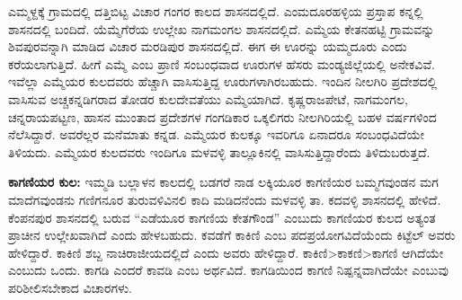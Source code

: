 ಎಮ್ಮಳ್ದಕ್ಕೆ ಗ್ರಾಮದಲ್ಲಿ ದತ್ತಿಬಿಟ್ಟ ವಿಚಾರ ಗಂಗರ ಕಾಲದ ಶಾಸನದಲ್ಲಿದೆ. ಎಂಮದೂರಹಳ್ಳಿಯ ಪ್ರಸ್ತಾಪ ಕನ್ನಲ್ಲಿ ಶಾಸನದಲ್ಲಿ ಬಂದಿದೆ. ಯೆಮ್ಮೆಗೆರೆಯ ಉಲ್ಲೇಖ ನಾಗಮಂಗಲ ಶಾಸನದಲ್ಲಿದೆ. ಎಮ್ಮೆಯ ಕೇತನಹಟ್ಟಿ ಗ್ರಾಮವನ್ನು ಶಿವಪುರವನ್ನಾಗಿ ಮಾಡಿದ ವಿಚಾರ ಮರಡಿಪುರ ಶಾಸನದಲ್ಲಿದೆ. ಈಗ ಈ ಊರನ್ನು ಯಮ್ಮದೂರು ಎಂದು ಕರೆಯಲಾಗುತ್ತಿದೆ. ಹೀಗೆ ಎಮ್ಮೆ ಎಂಬ ಪ್ರಾಣಿ ಸಂಬಂಧವಾದ ಊರುಗಳ ಹೆಸರು ಮಂಡ್ಯಜಿಲ್ಲೆಯಲ್ಲಿ ಅನೇಕವಿವೆ. ಇವೆಲ್ಲಾ ಎಮ್ಮೆಯರ ಕುಲದವರು ಹೆಚ್ಚಾಗಿ ವಾಸಿಸುತ್ತಿದ್ದ ಊರುಗಳಾಗಿರಬಹುದು. ಇಂದಿನ ನೀಲಗಿರಿ ಪ್ರದೇಶದಲ್ಲಿ ವಾಸಿಸುವ ಅಚ್ಚಕನ್ನಡಿಗರಾದ ತೋಡರ ಕುಲದೇವತೆಯು ಎಮ್ಮೆಯಾಗಿದೆ. ಕೃಷ್ಣರಾಜಪೇಟೆ, ನಾಗಮಂಗಲ, ಚನ್ನರಾಯಪಟ್ಟಣ, ಹಾಸನ ಮುಂತಾದ ಪ್ರದೇಶಗಳ ಗಂಗಡಿಕಾರ ಒಕ್ಕಲಿಗರು ನೀಲಗಿರಿಯಲ್ಲಿ ಬಹಳ ವರ್ಷಗಳಿಂದ ನೆಲೆಸಿದ್ದಾರೆ. ಅವರೆಲ್ಲರ ಮನೆಮಾತು ಕನ್ನಡ. ಎಮ್ಮೆಯರ ಕುಲಕ್ಕೂ ಇವರಿಗೂ ಏನಾದರೂ ಸಂಬಂಧವಿದೆಯೇ ತಿಳಿಯದು. ಎಮ್ಮೆಯರ ಕುಲದವರು ಇಂದಿಗೂ ಮಳವಳ್ಳಿ ತಾಲ್ಲೂಕಿನಲ್ಲಿ ವಾಸಿಸುತ್ತಿದ್ದಾರೆಂದು ತಿಳಿದುಬರುತ್ತದೆ.

\textbf{ಕಾಗಣಿಯರ ಕುಲ:} ಇಮ್ಮಡಿ ಬಲ್ಲಾಳನ ಕಾಲದಲ್ಲಿ ಬಡಗರೆ ನಾಡ ಲಕ್ಕಿಯೂರ ಕಾಗಣಿಯರ ಬಮ್ಮಗವುಂಡನ ಮಗ ಮಾದೆಗವುಂಡನು ಗಣಿಗನೂರ ತುರುವಳಿವಿನಲಿ ಕಾದಿ ಮಡಿದನೆಂದು ಮಳವಳ್ಳಿ ತಾ. ಕದವಳ್ಳಿ ಶಾಸನದಲ್ಲಿ ಹೇಳಿದೆ. ಕೆಂಪನಪುರ ಶಾಸನದಲ್ಲಿ ಬರುವ “ಎಡೆಯೂರ ಕಾಗಣಿಯ ಕೇತಗೌಂಡ” ಎಂಬುದು ಕಾಗಣಿಯರ ಕುಲದ ಅತ್ಯಂತ ಪ್ರಾಚೀನ ಉಲ್ಲೇಖವಾಗಿದೆ ಎಂದು ಹೇಳಬಹುದು. ಕವಡೆಗೆ ಕಾಕಿಣಿ ಎಂಬ ಪದಪ್ರಯೋಗವಿದೆಯೆಂದು ಕಿಟ್ಟೆಲ್​ ಅವರು ಹೇಳಿದ್ದಾರೆ. ಕಾಕಿಣಿ ಶಬ್ದ ನಾಚಿರಾಜೀಯದಲ್ಲಿದೆ ಎಂದು ಅವರು ಹೇಳಿದ್ದಾರೆ. ಕಾಕಿಣಿ\textgreater ಕಾಕಣಿ\textgreater ಕಾಗಣಿ ಆಗಿದೆಯೇ ಎಂಬುದು ಒಂದು. ಕಾಗಡಿ ಎಂದರೆ ಕಾವಡಿ ಎಂಬ ಅರ್ಥವಿದೆ. ಕಾಗಡಿಯಿಂದ ಕಾಗಣಿ ನಿಷ್ಪನ್ನವಾಗಿದೆಯೇ ಎಂಬುವು ಪರಿಶೀಲಿಸಬೇಕಾದ ವಿಚಾರಗಳು.

